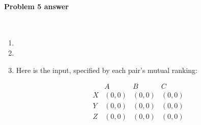\paragraph{Problem 5 answer}~

\begin{enumerate}[label=(\alph*)]


\item %

  \BLUE{
    \REPLACEME
  }


\item %

  \BLUE{
    \REPLACEME
  }


\item %

  Here is the input, specified by each pair's mutual ranking:
  
  
  \begin{blue}
    \[
    \begin{array}{c|ccc}
       & A & B & C \\\hline
      X & (0, 0) & (0, 0) & (0, 0)  \\
      Y & (0, 0) & (0, 0) & (0, 0)  \\
      Z & (0, 0) & (0, 0) & (0, 0)
    \end{array}
    \]
  \end{blue}



\end{enumerate}
